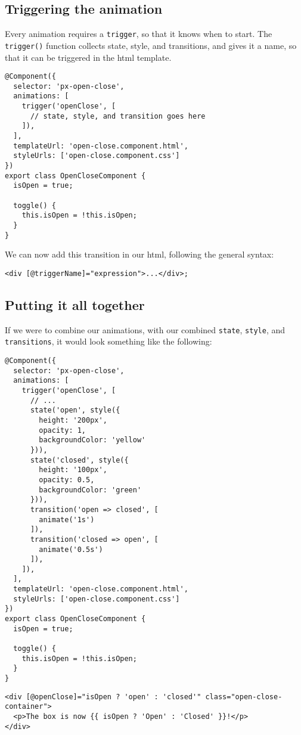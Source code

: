 \subsection{Triggering the animation}
Every animation requires a \lstinline{trigger}, so that it knows when to start. 
The \lstinline{trigger()} function collects state, style, and transitions,
and gives it a name, so that it can be triggered in the html template. 

\begin{lstlisting}[caption=open-close.component.ts]
@Component({
  selector: 'px-open-close',
  animations: [
    trigger('openClose', [
      // state, style, and transition goes here
    ]),
  ],
  templateUrl: 'open-close.component.html',
  styleUrls: ['open-close.component.css']
})
export class OpenCloseComponent {
  isOpen = true;

  toggle() {
    this.isOpen = !this.isOpen;
  }
}
\end{lstlisting}

We can now add this transition in our html, following the general syntax: 
\begin{lstlisting}[caption=*.html]
<div [@triggerName]="expression">...</div>;
\end{lstlisting}

\subsection{ Putting it all together }
If we were to combine our animations, with our combined \lstinline{state}, 
\lstinline{style}, and \lstinline{transitions}, it would look something like 
the following:
\begin{lstlisting}[caption=open-close.component.ts]
@Component({
  selector: 'px-open-close',
  animations: [
    trigger('openClose', [
      // ...
      state('open', style({
        height: '200px',
        opacity: 1,
        backgroundColor: 'yellow'
      })),
      state('closed', style({
        height: '100px',
        opacity: 0.5,
        backgroundColor: 'green'
      })),
      transition('open => closed', [
        animate('1s')
      ]),
      transition('closed => open', [
        animate('0.5s')
      ]),
    ]),
  ],
  templateUrl: 'open-close.component.html',
  styleUrls: ['open-close.component.css']
})
export class OpenCloseComponent {
  isOpen = true;

  toggle() {
    this.isOpen = !this.isOpen;
  }
}
\end{lstlisting}

\begin{lstlisting}[caption=open-close.component.html]
<div [@openClose]="isOpen ? 'open' : 'closed'" class="open-close-container">
  <p>The box is now {{ isOpen ? 'Open' : 'Closed' }}!</p>
</div>
\end{lstlisting}